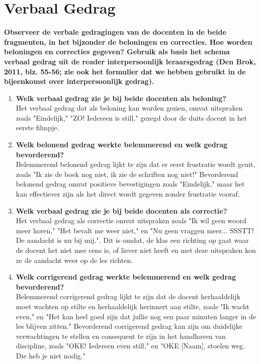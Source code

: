 \documentclass{article}
\begin{document}
    \section{Verbaal Gedrag}
    \textbf{ Observeer de verbale gedragingen van de docenten in de beide 
    fragmenten, in het bijzonder de beloningen en correcties. Hoe worden 
    beloningen en correcties gegeven? Gebruik als basis het schema verbaal 
    gedrag uit de reader interpersoonlijk leraarsgedrag (Den Brok, 2011, blz. 
    55-56; zie ook het formulier dat we hebben gebruikt in de bijeenkomst over 
    interpersoonlijk gedrag).}
    \begin{enumerate}[label=(\alph*)]
        \item \textbf{Welk verbaal gedrag zie je bij beide docenten als 
            beloning?} \\
            Het verbaal gedrag dat als beloning kan worden gezien, omvat 
            uitspraken zoals "Eindelijk," "ZO! Iedereen is still," gezegd door
            de duits docent in het eerste filmpje.
        \item \textbf{Welk belonend gedrag werkte belemmerend en welk gedrag 
        bevorderend?} \\
            Belemmerend belonend gedrag lijkt te zijn dat er eerst frustratie 
            wordt geuit, zoals "Ik zie de boek nog niet, ik zie de schriften nog
            niet!" Bevorderend belonend gedrag omvat positieve bevestigingen 
            zoals "Eindelijk," maar het kan effectiever zijn als het direct 
            wordt gegeven zonder frustratie vooraf.
        \item \textbf{Welk verbaal gedrag zie je bij beide docenten als 
        correctie? \\}
            Het verbaal gedrag als correctie omvat uitspraken zoals "Ik wil geen
            woord meer horen," "Het bevalt me weer niet," en "Nu geen vraggen 
            meer... SSSTT! De aandacht is nu bij mij.". Dit is omdat, de klas 
            een richting op gaat waar de docent het niet mee eens is, of liever
            niet heeft en met deze uitspraken kon ze de aandacht weer op de les
            richten.
        \item \textbf{Welk corrigerend gedrag werkte belemmerend en welk gedrag 
        bevorderend?} \\
            Belemmerend corrigerend gedrag lijkt te zijn dat de docent 
            herhaaldelijk moet wachten op stilte en herhaaldelijk herinnert aan 
            stilte, zoals "Ik wacht even," en "Het kan heel goed zijn dat jullie
            nog een paar minuten langer in de les blijven zitten." Bevorderend 
            corrigerend gedrag kan zijn om duidelijke verwachtingen te stellen 
            en consequent te zijn in het handhaven van discipline, zoals "OKE! 
            Iedereen even still," en "OKE [Naam], stoelen weg. Die heb je niet 
            nodig."
    \end{enumerate}
    \newpage
\end{document}
